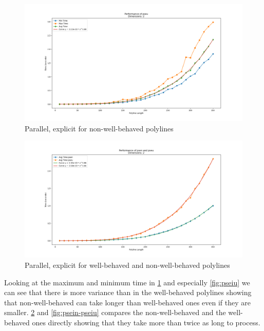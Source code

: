 \begin{figure}[ht]
  \centering
  \includegraphics[scale=0.5, width=\linewidth]{figures/pseu.png}
  \caption{Parallel, explicit for non-well-behaved polylines}
  \label{fig:pseu}
\end{figure}

\begin{figure}[ht]
  \centering
  \includegraphics[scale=0.5, width=\linewidth]{figures/psen-pseu.png}
  \caption{Parallel, explicit for well-behaved and non-well-behaved polylines}
  \label{fig:psen-pseu}
\end{figure}

Looking at the maximum and minimum time in \cref{fig:pseu} and especially \cref{fig:pseiu} we can see that there is more variance than in the well-behaved polylines showing that non-well-behaved can take longer than well-behaved ones even if they are smaller. \cref{fig:psen-pseu} and \cref{fig:psein-pseiu} compares the non-well-behaved and the well-behaved ones directly showing that they take more than twice as long to process.

